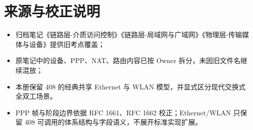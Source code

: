 \documentclass[UTF8,fontset=none,11pt,a4paper]{ctexart}
\providecommand{\tightlist}{\setlength{\itemsep}{0pt}\setlength{\parskip}{0pt}}
\begin{document}
\section{来源与校正说明}\label{15-ux6765ux6e90ux4e0eux6821ux6b63ux8bf4ux660e}

\begin{itemize}
\tightlist
\item
  归档笔记《链路层-介质访问控制》《链路层-局域网与广域网》《物理层-传输媒体与设备》提供旧考点覆盖；
\item
  原笔记中的设备、PPP、NAT、路由内容已按 Owner
  拆分，未因旧文件名继续混放；
\item
  本册保留 408 的经典共享 Ethernet 与 WLAN
  模型，并显式区分现代交换式全双工场景。
\item
  PPP 帧与阶段边界依据 RFC 1661、RFC 1662 校正；Ethernet/WLAN 只保留 408 可调用的体系结构与字段语义，不展开标准实现扩展。
\end{itemize}
\end{document}
